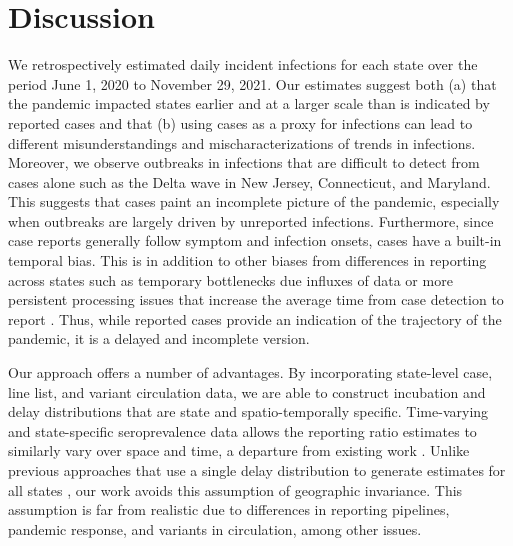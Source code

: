 \section{Discussion}

We retrospectively estimated daily incident infections for each \US state over
the period June 1, 2020 to November 29, 2021. Our estimates suggest both (a)
that the pandemic impacted states earlier and at a larger scale than is
indicated by reported cases and that (b) using cases as a proxy for 
infections can lead to different misunderstandings and mischaracterizations of
trends in infections. Moreover, we observe
outbreaks in infections that are difficult to detect from cases alone such as
the Delta wave in New Jersey, Connecticut, and Maryland. This suggests that
cases paint an incomplete picture of the pandemic, especially when outbreaks are
largely driven by unreported infections. Furthermore, since case reports
generally follow symptom and infection onsets, cases have a built-in temporal
bias. This is in addition to other biases from differences in reporting across
states such as temporary bottlenecks due influxes of data or more persistent
processing issues that increase the average time from case detection to report
\citep{wash2020dash, dunkel2020covid19}. Thus, while reported cases provide an
indication of the trajectory of the pandemic, it is a delayed and incomplete
version.

Our approach offers a number of advantages. By incorporating 
state-level case, line list, and variant circulation data, we are able to construct 
incubation and delay distributions that are state and spatio-temporally specific.
Time-varying and state-specific seroprevalence data allows the reporting ratio
estimates to similarly vary over space and time, a departure from existing work
\citep{unwin2020state, uga2020covid19}. Unlike previous approaches that use
a single delay distribution to generate estimates 
for all states \citep{chitwood2022reconstructing,
jahja2022real}, our work avoids this assumption of geographic
invariance. This assumption is far from realistic due to
differences in reporting pipelines, pandemic response, and variants in
circulation, among other issues. 

